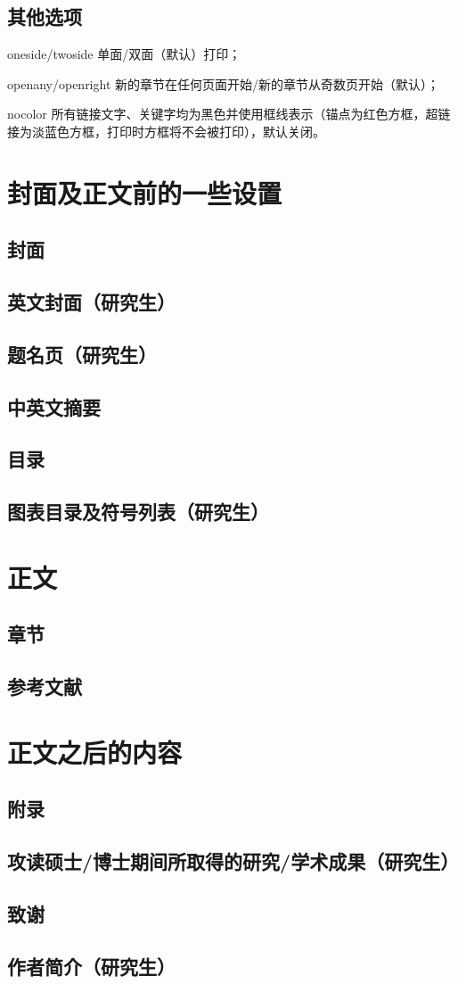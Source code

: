 		\subsection{其他选项}
		\begin{description}
			\item{oneside\slash twoside} 单面\slash 双面（默认）打印；
			\item{openany\slash openright} 新的章节在任何页面开始\slash 新的章节从奇数页开始（默认）；
			\item{nocolor} 所有链接文字、关键字均为黑色并使用框线表示（锚点为红色方框，超链接为淡蓝色方框，打印时方框将不会被打印），默认关闭。
		\end{description}

	\section{封面及正文前的一些设置}
		\subsection{封面}
		\subsection{英文封面（研究生）}
		\subsection{题名页（研究生）}
		\subsection{中英文摘要}
		\subsection{目录}
		\subsection{图表目录及符号列表（研究生）}
	\section{正文}
		\subsection{章节}
		\subsection{参考文献}
	\section{正文之后的内容}
		\subsection{附录}
		\subsection{攻读硕士\slash 博士期间所取得的研究\slash 学术成果（研究生）}
		\subsection{致谢}
		\subsection{作者简介（研究生）}
